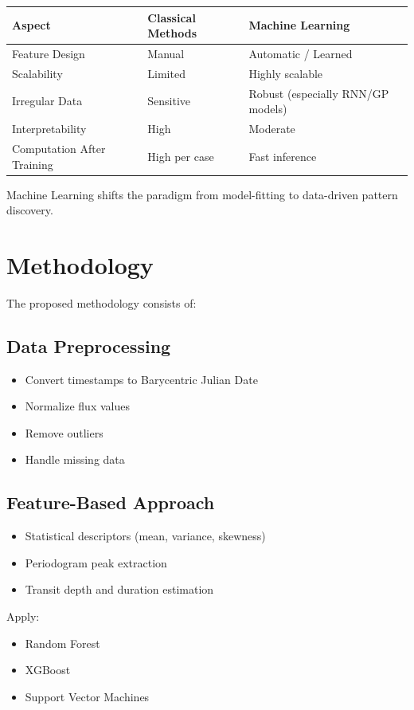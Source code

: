 \documentclass[12pt]{article}
\begin{document}
\begin{center}
\begin{tabular}{|p{3cm}|p{5cm}|p{5cm}|}
\hline
Aspect & Classical Methods & Machine Learning \\
\hline
Feature Design & Manual & Automatic / Learned \\
\hline
Scalability & Limited & Highly scalable \\
\hline
Irregular Data & Sensitive & Robust (especially RNN/GP models) \\
\hline
Interpretability & High & Moderate \\
\hline
Computation After Training & High per case & Fast inference \\
\hline
\end{tabular}
\end{center}

Machine Learning shifts the paradigm from model-fitting to data-driven pattern discovery.

\section{Methodology}

The proposed methodology consists of:

\subsection{Data Preprocessing}
\begin{itemize}
    \item Convert timestamps to Barycentric Julian Date
    \item Normalize flux values
    \item Remove outliers
    \item Handle missing data
\end{itemize}

\subsection{Feature-Based Approach}
\begin{itemize}
    \item Statistical descriptors (mean, variance, skewness)
    \item Periodogram peak extraction
    \item Transit depth and duration estimation
\end{itemize}

Apply:
\begin{itemize}
    \item Random Forest
    \item XGBoost
    \item Support Vector Machines
\end{itemize}
\end{document}
